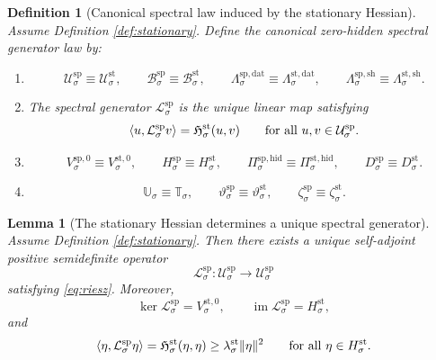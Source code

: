 \documentclass[11pt]{article}
\newcommand{\SpecSpace}[1]{\mathcal U_{#1}^{\mathrm{sp}}}
\newcommand{\SpecBody}[1]{\mathcal B_{#1}^{\mathrm{sp}}}
\newcommand{\SpecData}[1]{\Lambda_{#1}^{\mathrm{sp,dat}}}
\newcommand{\SpecShell}[1]{\Lambda_{#1}^{\mathrm{sp,sh}}}
\newcommand{\SpecOp}[1]{\mathcal L_{#1}^{\mathrm{sp}}}
\newcommand{\SpecZero}[1]{V_{#1}^{\mathrm{sp},0}}
\newcommand{\SpecHidden}[1]{H_{#1}^{\mathrm{sp}}}
\newcommand{\SpecHiddenBody}[1]{D_{#1}^{\mathrm{sp}}}
\newcommand{\SpecProj}[1]{\Pi_{#1}^{\mathrm{sp,hid}}}
\newcommand{\SpecSym}[1]{\mathbb U_{#1}}
\newcommand{\SpecTime}[1]{\vartheta_{#1}^{\mathrm{sp}}}
\newcommand{\SpecEmbed}[1]{\zeta_{#1}^{\mathrm{sp}}}
\newcommand{\StatSpace}[1]{\mathcal U_{#1}^{\mathrm{st}}}
\newcommand{\StatBody}[1]{\mathcal B_{#1}^{\mathrm{st}}}
\newcommand{\StatData}[1]{\Lambda_{#1}^{\mathrm{st,dat}}}
\newcommand{\StatShell}[1]{\Lambda_{#1}^{\mathrm{st,sh}}}
\newcommand{\StatZero}[1]{V_{#1}^{\mathrm{st},0}}
\newcommand{\StatHidden}[1]{H_{#1}^{\mathrm{st}}}
\newcommand{\StatHiddenBody}[1]{D_{#1}^{\mathrm{st}}}
\newcommand{\StatProj}[1]{\Pi_{#1}^{\mathrm{st,hid}}}
\newcommand{\StatHess}[1]{\mathfrak H_{#1}^{\mathrm{st}}}
\newcommand{\StatSym}[1]{\mathbb T_{#1}}
\newcommand{\StatTime}[1]{\vartheta_{#1}^{\mathrm{st}}}
\newcommand{\StatEmbed}[1]{\zeta_{#1}^{\mathrm{st}}}
\newtheorem{definition}{Definition}
\newtheorem{lemma}{Lemma}
\begin{document}
\begin{definition}[Canonical spectral law induced by the stationary Hessian]
\label{def:canonical}
Assume Definition \ref{def:stationary}. Define the canonical zero-hidden spectral generator law by:
\begin{enumerate}
    \item
    \[
    \SpecSpace{\sigma}\equiv\StatSpace{\sigma},
    \qquad
    \SpecBody{\sigma}\equiv\StatBody{\sigma},
    \qquad
    \SpecData{\sigma}\equiv\StatData{\sigma},
    \qquad
    \SpecShell{\sigma}\equiv\StatShell{\sigma}.
    \]
    \item The spectral generator \(\SpecOp{\sigma}\) is the unique linear map satisfying
    \begin{equation}
    \ev{u,\SpecOp{\sigma}v}
    =
    \StatHess{\sigma}(u,v)
    \qquad
    \text{for all }u,v\in\SpecSpace{\sigma}.
    \label{eq:riesz}
    \end{equation}
    \item
    \[
    \SpecZero{\sigma}\equiv\StatZero{\sigma},
    \qquad
    \SpecHidden{\sigma}\equiv\StatHidden{\sigma},
    \qquad
    \SpecProj{\sigma}\equiv\StatProj{\sigma},
    \qquad
    \SpecHiddenBody{\sigma}\equiv\StatHiddenBody{\sigma}.
    \]
    \item
    \[
    \SpecSym{\sigma}\equiv\StatSym{\sigma},
    \qquad
    \SpecTime{\sigma}\equiv\StatTime{\sigma},
    \qquad
    \SpecEmbed{\sigma}\equiv\StatEmbed{\sigma}.
    \]
\end{enumerate}
\end{definition}

\begin{lemma}[The stationary Hessian determines a unique spectral generator]
\label{lem:riesz}
Assume Definition \ref{def:stationary}. Then there exists a unique self-adjoint positive semidefinite operator
\[
\SpecOp{\sigma}:\SpecSpace{\sigma}\to\SpecSpace{\sigma}
\]
satisfying \eqref{eq:riesz}. Moreover,
\[
\ker\SpecOp{\sigma}=\StatZero{\sigma},
\qquad
\operatorname{im}\SpecOp{\sigma}=\StatHidden{\sigma},
\]
and
\[
\ev{\eta,\SpecOp{\sigma}\eta}
=
\StatHess{\sigma}(\eta,\eta)
\ge
\lambda_{\sigma}^{\mathrm{st}}\|\eta\|^{2}
\qquad
\text{for all }\eta\in\StatHidden{\sigma}.
\]
\end{lemma}
\end{document}
